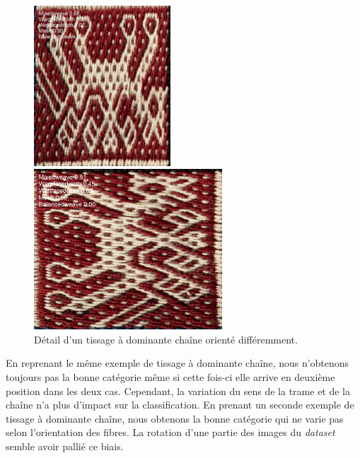 \begin{figure}[!h]
 \begin{minipage}[c]{.5\linewidth}
        \begin{center}
        		\includegraphics[height=6cm]{../images/weave1eqaugm.jpg}
	\end{center}
    \end{minipage}
            \begin{minipage}[c]{.5\linewidth}
        \begin{center}
        		\includegraphics[height=6cm]{../images/weave1reqaugm.jpg}
	\end{center}
    \end{minipage}
    \caption{Détail d'un tissage à dominante chaîne orienté différemment.}
\end{figure}

En reprenant le même exemple de tissage à dominante chaîne, nous n'obtenons toujours pas la bonne catégorie même si cette fois-ci elle arrive en deuxième position dans les deux cas. Cependant, la variation du sens de la trame et de la chaîne n'a plus d'impact sur la classification. En prenant un seconde exemple de tissage à dominante chaîne, nous obtenons la bonne catégorie qui ne varie pas selon l'orientation des fibres. La rotation d'une partie des images du \textit{dataset} semble avoir pallié ce biais.

